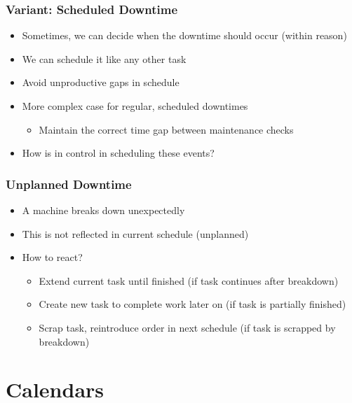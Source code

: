 \begin{frame}
\frametitle{Variant: Scheduled Downtime \navail}
\begin{itemize}
\item Sometimes, we can decide when the downtime should occur (within reason)
\item We can schedule it like any other task
\item Avoid unproductive gaps in schedule
\item More complex case for regular, scheduled downtimes
\begin{itemize}
\item Maintain the correct time gap between maintenance checks
\end{itemize}

\item How is in control in scheduling these events?
\end{itemize}
\end{frame}

\begin{frame}
\frametitle{Unplanned Downtime \navail}
\begin{itemize}
\item A machine breaks down unexpectedly
\item This is not reflected in current schedule (unplanned)
\item How to react?
\begin{itemize}
\item Extend current task until finished (if task continues after breakdown)
\item Create new task to complete work later on (if task is partially finished)
\item Scrap task, reintroduce order in next schedule (if task is scrapped by breakdown)
\end{itemize}

\end{itemize}
\end{frame}







\section{Calendars}

